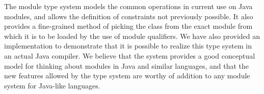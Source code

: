 The module type system models the common operations
in current use on Java modules, and allows the definition of constraints
not previously possible. It also provides a fine-grained
method of picking the class from the exact module from which
it is to be loaded by the use of module qualifiers. We have
also provided an implementation to demonstrate that it is
possible to realize this type system in an actual Java compiler.
We believe that the system provides a good conceptual
model for thinking about modules in Java and similar languages,
and that the new features allowed by the type system are worthy
of addition to any module system for Java-like languages.